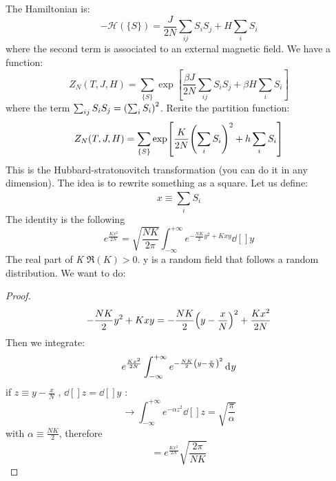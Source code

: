 \documentclass[../main/main.tex]{subfiles}
\begin{document}

The Hamiltonian is:
\begin{equation}
  - \mathcal{H} ( \{ S \}  ) = \frac{J}{2N} \sum_{ij}^{} S_i S_j + H \sum_{i}^{} S_i
\end{equation}
where the second term is associated to an external magnetic field. We have a function:
\begin{equation}
Z_N (T,J,H) = \sum_{\{ S \}  }^{} \exp [\frac{\beta J}{2N} \sum_{ij}^{} S_i S_j + \beta H \sum_{i}^{} S_i    ]
\end{equation}
where the term \( \sum_{ij}^{} S_i S_j  = \qty( \sum_{i}^{} S_i )^2 \). Rerite the partition function:
\begin{equation}
  Z_N (T,J,H)  =   \sum_{\{ S \}  }^{} \exp  [\frac{K}{2N} \qty( \sum_{i}^{} S_i )^2 + h \sum_{i}^{} S_i    ]
\end{equation}
This is the Hubbard-stratonovitch transformation (you can do it in any dimension). The idea is to rewrite something as a square. Let us define:
\begin{equation}
  x \equiv \sum_{i}^{} S_i
\end{equation}
The identity is the following
\begin{equation}
  e^{\frac{K x^2}{2N}} =  \sqrt{\frac{N K}{2 \pi }} \int_{-\infty }^{+\infty } e^{-\frac{N K}{2}y^2+Kxy} \dd[]{y}
\end{equation}
The real part of \emph{K} \( \Re(K) >0  \). y is a random field that follows a random distribution. We want to do:
\begin{proof}
  \begin{equation}
    - \frac{N K}{2} y^2 + K x y = - \frac{N K}{2} \qty(y - \frac{x}{N})^2 + \frac{K x^2}{2N}
  \end{equation}
  Then we integrate:
  \begin{equation}
    e^{\frac{K x^2}{2N}} \int_{- \infty }^{+ \infty } e^{- \frac{N K}{2} \qty(y - \frac{x}{N})^2 } \dd[]{y}
  \end{equation}
  if \( z \equiv y - \frac{x}{N} \) , \( \dd[]{z} = \dd[]{y}   \) :
  \begin{equation}
    \rightarrow \int_{-\infty }^{+\infty } e^{- \alpha z^2} \dd[]{z} = \sqrt{\frac{\pi }{\alpha }}
  \end{equation}
  with \( \alpha \equiv \frac{N K}{2} \), therefore
  \begin{equation}
    = e^{\frac{K x^2}{2N}} \sqrt{\frac{2 \pi }{N K}}
  \end{equation}
\end{proof}
\end{document}
